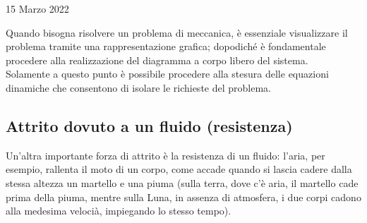 \documentclass[a4paper]{extarticle}
\begin{document}
\newpage
\noindent
\begin{center}
  15 Marzo 2022
\end{center}
Quando bisogna risolvere un problema di meccanica, è essenziale visualizzare il problema tramite una rappresentazione grafica; dopodiché è fondamentale procedere alla realizzazione del diagramma a corpo libero del sistema.\\
Solamente a questo punto è possibile procedere alla stesura delle equazioni dinamiche che consentono di isolare le richieste del problema.

\vspace{1em}
\subsection{Attrito dovuto a un fluido (resistenza)}
Un'altra importante forza di attrito è la resistenza di un fluido: l'aria, per esempio, rallenta il moto di un corpo, come accade quando si lascia cadere dalla stessa altezza un martello e una piuma (sulla terra, dove c'è aria, il martello cade prima della piuma, mentre sulla Luna, in assenza di atmosfera, i due corpi cadono alla medesima velocià, impiegando lo stesso tempo).
\end{document}
